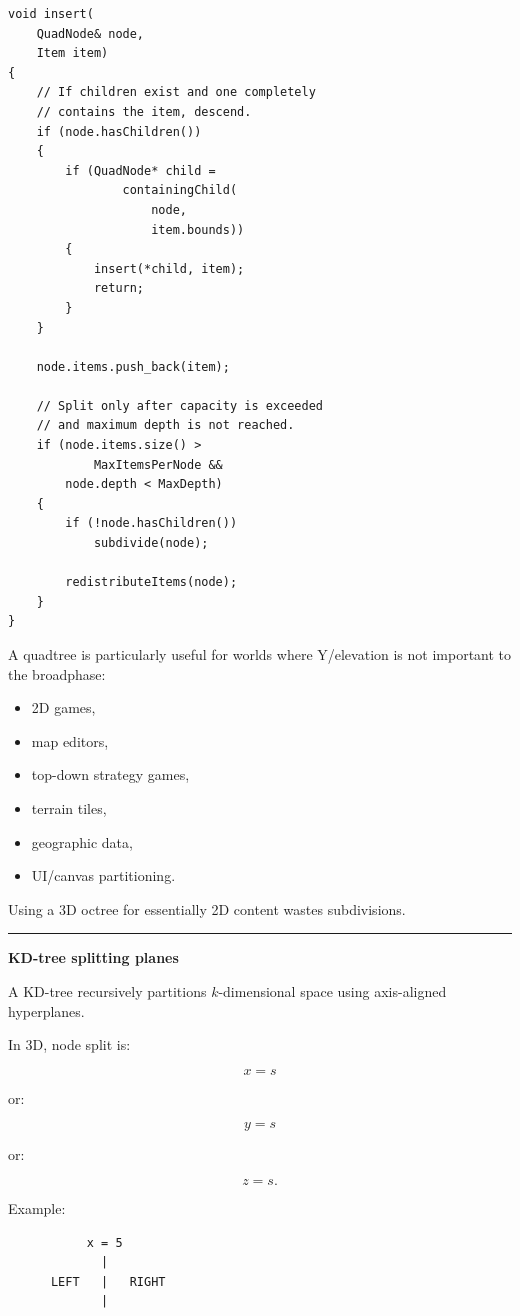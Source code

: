 \begin{verbatim}
void insert(
    QuadNode& node,
    Item item)
{
    // If children exist and one completely
    // contains the item, descend.
    if (node.hasChildren())
    {
        if (QuadNode* child =
                containingChild(
                    node,
                    item.bounds))
        {
            insert(*child, item);
            return;
        }
    }

    node.items.push_back(item);

    // Split only after capacity is exceeded
    // and maximum depth is not reached.
    if (node.items.size() >
            MaxItemsPerNode &&
        node.depth < MaxDepth)
    {
        if (!node.hasChildren())
            subdivide(node);

        redistributeItems(node);
    }
}
\end{verbatim}

A quadtree is particularly useful for worlds where Y/elevation is not important to the broadphase:

\begin{itemize}
\tightlist
\item
  2D games,
\item
  map editors,
\item
  top-down strategy games,
\item
  terrain tiles,
\item
  geographic data,
\item
  UI/canvas partitioning.
\end{itemize}

Using a 3D octree for essentially 2D content wastes subdivisions.

\begin{center}\rule{0.5\linewidth}{0.5pt}\end{center}

\textbf{KD-tree splitting planes}

A KD-tree recursively partitions \(k\)-dimensional space using axis-aligned hyperplanes.

In 3D, node split is:

\[
x=s
\]

or:

\[
y=s
\]

or:

\[
z=s.
\]

Example:

\begin{verbatim}
           x = 5
             |
      LEFT   |   RIGHT
             |
\end{verbatim}

